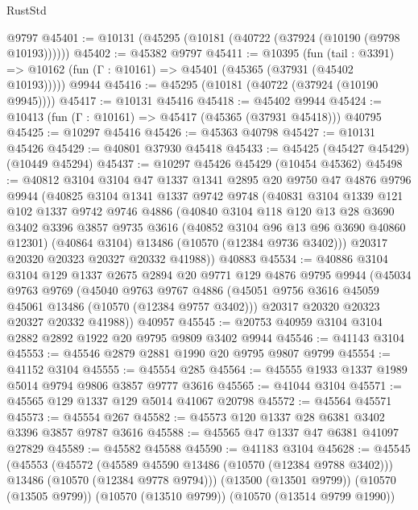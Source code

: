 \begin{lexlean}{RustStd}
\begin{coremodule}
    @9797
@45401 := @10131 (@45295 (@10181 (@40722 (@37924 (@10190 (@9798 @10193))))))
@45402 := @45382 @9797
@45411 := @10395
    (fun (tail : @3391) => @10162 (fun (Γ : @10161) => @45401 (@45365 (@37931 (@45402 @10193)))))
    @9944
@45416 := @45295 (@10181 (@40722 (@37924 (@10190 @9945))))
@45417 := @10131 @45416
@45418 := @45402 @9944
@45424 := @10413 (fun (Γ : @10161) => @45417 (@45365 (@37931 @45418))) @40795
@45425 := @10297 @45416
@45426 := @45363 @40798
@45427 := @10131 @45426
@45429 := @40801 @37930 @45418
@45433 := @45425 (@45427 @45429) (@10449 @45294)
@45437 := @10297 @45426 @45429 (@10454 @45362)
@45498 := @40812
    @3104
    @3104
    @47
    @1337
    @1341
    @2895
    @20
    @9750
    @47
    @4876
    @9796
    @9944
    (@40825
      @3104
      @1341
      @1337
      @9742
      @9748
      (@40831
        @3104
        @1339
        @121
        @102
        @1337
        @9742
        @9746
        @4886
        (@40840
          @3104
          @118
          @120
          @13
          @28
          @3690
          @3402
          @3396
          @3857
          @9735
          @3616
          (@40852 @3104 @96 @13 @96 @3690 @40860 @12301)
          (@40864 @3104)
          @13486
          (@10570 (@12384 @9736 @3402)))
        @20317
        @20320
        @20323
        @20327
        @20332
        @41988))
    @40883
@45534 := @40886
    @3104
    @3104
    @129
    @1337
    @2675
    @2894
    @20
    @9771
    @129
    @4876
    @9795
    @9944
    (@45034
      @9763
      @9769
      (@45040
        @9763
        @9767
        @4886
        (@45051 @9756 @3616 @45059 @45061 @13486 (@10570 (@12384 @9757 @3402)))
        @20317
        @20320
        @20323
        @20327
        @20332
        @41988))
    @40957
@45545 := @20753 @40959 @3104 @3104 @2882 @2892 @1922 @20 @9795 @9809 @3402 @9944
@45546 := @41143 @3104
@45553 := @45546 @2879 @2881 @1990 @20 @9795 @9807 @9799
@45554 := @41152 @3104
@45555 := @45554 @285
@45564 := @45555 @1933 @1337 @1989 @5014 @9794 @9806 @3857 @9777 @3616
@45565 := @41044 @3104
@45571 := @45565 @129 @1337 @129 @5014 @41067 @20798
@45572 := @45564 @45571
@45573 := @45554 @267
@45582 := @45573 @120 @1337 @28 @6381 @3402 @3396 @3857 @9787 @3616
@45588 := @45565 @47 @1337 @47 @6381 @41097 @27829
@45589 := @45582 @45588
@45590 := @41183 @3104
@45628 := @45545
    (@45553
      (@45572
        (@45589 @45590 @13486 (@10570 (@12384 @9788 @3402)))
        @13486
        (@10570 (@12384 @9778 @9794)))
      (@13500 (@13501 @9799))
      (@10570 (@13505 @9799))
      (@10570 (@13510 @9799))
      (@10570 (@13514 @9799 @1990))

\end{coremodule}
\end{lexlean}

